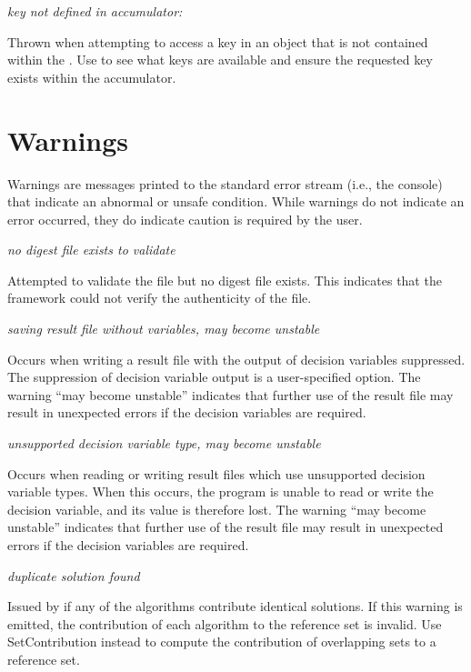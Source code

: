 \noindent
\textit{key not defined in accumulator: }
\begin{indented}
  Thrown when attempting to access a key in an  object that is not contained within the .  Use  to see what keys are available and ensure the requested key exists within the accumulator.
\end{indented}


\section{Warnings}
Warnings are messages printed to the standard error stream (i.e., the console) that indicate an abnormal or unsafe condition.  While warnings do not indicate an error occurred, they do indicate caution is required by the user.
\vspace{\baselineskip}

\noindent
\textit{no digest file exists to validate }
\begin{indented}
  Attempted to validate the file but no digest file exists.  This indicates that the framework could not verify the authenticity of the file.
\end{indented}
  
\noindent
\textit{saving result file without variables, may become unstable}
\begin{indented}
  Occurs when writing a result file with the output of decision variables suppressed.  The suppression of decision variable output is a user-specified option.  The warning ``may become unstable'' indicates that further use of the result file may result in unexpected errors if the decision variables are required.
\end{indented}
  
\noindent
\textit{unsupported decision variable type, may become unstable}
\begin{indented}
  Occurs when reading or writing result files which use unsupported decision variable types.  When this occurs, the program is unable to read or write the decision variable, and its value is therefore lost.  The warning ``may become unstable'' indicates that further use of the result file may result in unexpected errors if the decision variables are required.
\end{indented}
  
\noindent
\textit{duplicate solution found}
\begin{indented}
  Issued by  if any of the algorithms contribute identical solutions.  If this warning is emitted, the contribution of each algorithm to the reference set is invalid.  Use SetContribution instead to compute the contribution of overlapping sets to a reference set.
\end{indented}
  
